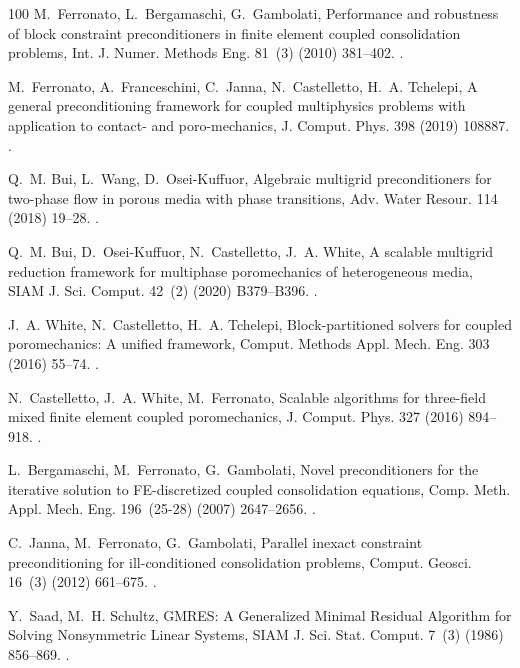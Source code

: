 \documentclass[3p,times]{elsarticle}
\theoremstyle{plain}
\begin{document}
\begin{thebibliography}{100}
M.~Ferronato, L.~Bergamaschi, G.~Gambolati, Performance and robustness of block
  constraint preconditioners in finite element coupled consolidation problems,
  Int. J. Numer. Methods Eng. 81~(3) (2010) 381--402.
\newblock \href {https://doi.org/10.1002/nme.2702}
  {}.

M.~Ferronato, A.~Franceschini, C.~Janna, N.~Castelletto, H.~A. Tchelepi, A
  general preconditioning framework for coupled multiphysics problems with
  application to contact- and poro-mechanics, J. Comput. Phys. 398 (2019)
  108887.
\newblock \href {https://doi.org/10.1016/j.jcp.2019.108887}
  {}.

Q.~M. Bui, L.~Wang, D.~Osei-Kuffuor, Algebraic multigrid preconditioners for
  two-phase flow in porous media with phase transitions, Adv. Water Resour. 114
  (2018) 19--28.
\newblock \href {https://doi.org/10.1016/j.advwatres.2018.01.027}
  {}.

Q.~M. Bui, D.~Osei-Kuffuor, N.~Castelletto, J.~A. White, A scalable multigrid
  reduction framework for multiphase poromechanics of heterogeneous media, SIAM
  J. Sci. Comput. 42~(2) (2020) B379--B396.
\newblock \href {https://doi.org/10.1137/19M1256117}
  {}.

J.~A. White, N.~Castelletto, H.~A. Tchelepi, {Block-partitioned solvers for
  coupled poromechanics: A unified framework}, Comput. Methods Appl. Mech. Eng.
  303 (2016) 55--74.
\newblock \href {https://doi.org/10.1016/j.cma.2016.01.008}
  {}.

N.~Castelletto, J.~A. White, M.~Ferronato, {Scalable algorithms for three-field
  mixed finite element coupled poromechanics}, J. Comput. Phys. 327 (2016)
  894--918.
\newblock \href {https://doi.org/10.1016/j.jcp.2016.09.063}
  {}.

L.~Bergamaschi, M.~Ferronato, G.~Gambolati, {Novel preconditioners for the
  iterative solution to FE-discretized coupled consolidation equations}, Comp.
  Meth. Appl. Mech. Eng. 196~(25-28) (2007) 2647--2656.
\newblock \href {https://doi.org/10.1016/j.cma.2007.01.013}
  {}.

C.~Janna, M.~Ferronato, G.~Gambolati, Parallel inexact constraint
  preconditioning for ill-conditioned consolidation problems, Comput. Geosci.
  16~(3) (2012) 661--675.
\newblock \href {https://doi.org/10.1007/s10596-012-9276-4}
  {}.

Y.~Saad, M.~H. Schultz, {GMRES: A Generalized Minimal Residual Algorithm for
  Solving Nonsymmetric Linear Systems}, SIAM J. Sci. Stat. Comput. 7~(3) (1986)
  856--869.
\newblock \href {https://doi.org/10.1137/0907058} {}.

\end{thebibliography}
\end{document}
